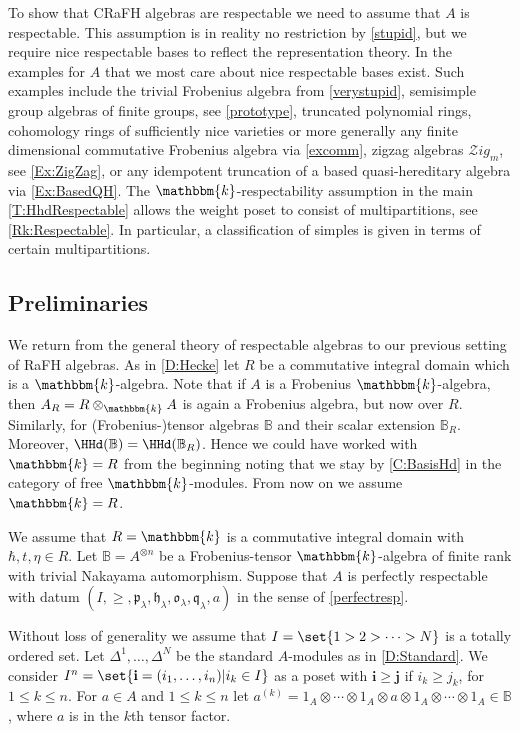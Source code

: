 \documentclass[a4paper,11pt]{amsart}
\newcommand\bi{\mathbf{i}}
\newcommand\bj{\mathbf{j}}
\numberwithin{equation}{subsection}
\theoremstyle{definition}
\theoremstyle{theorem}
\theoremstyle{remark}
\newcommand\kk{\mathbbm{k}}
\newcommand\RR{R}
\newcommand{\Bo}{\mathbb{B}}
\begin{document}
To show that CRaFH algebras are respectable we need to assume that $A$ is respectable.
This assumption is in reality no restriction by \autoref{stupid}, but we require nice respectable bases to reflect the representation theory. In the examples for $A$ that we most care about nice respectable bases exist. Such examples include  the trivial Frobenius algebra from \autoref{verystupid}, semisimple group algebras of finite
groups, see \autoref{prototype}, truncated polynomial rings, cohomology rings of
sufficiently nice varieties or more generally any finite dimensional
commutative Frobenius algebra via  \autoref{excomm},  zigzag algebras $\mathcal{Z}ig_m$, see \autoref{Ex:ZigZag}, or any idempotent truncation of a based quasi-hereditary algebra via  \autoref{Ex:BasedQH}. The $\kk$-respectability assumption in the main  \autoref{T:HhdRespectable}  allows the weight poset to consist of multipartitions, see \autoref{Rk:Respectable}. In particular,  a classification of simples is given in terms of certain multipartitions.

\subsection{Preliminaries}
We return from the general theory of respectable algebras to our previous setting of RaFH algebras. As in \autoref{D:Hecke} let $\RR$ be a commutative integral domain which is a $\kk$-algebra.  Note that if $A$ is a Frobenius $\kk$-algebra, then $A_R=R\otimes_\kk A$ is again a Frobenius algebra, but now over $R$. Similarly, for (Frobenius-)tensor algebras $\Bo$ and their scalar extension $\Bo_R$.  Moreover,  $\HHd(\Bo)=\HHd(\Bo_R)$. Hence we could have worked with $\kk=R$ from the beginning noting that we stay by \autoref{C:BasisHd} in the category of free $\kk$-modules. From now on we assume $\kk=\RR$.

\begin{Setup} \label{setups9}
We assume that $\RR=\kk$ is a commutative integral domain with $\hbar,t,\eta\in R$. Let $\Bo=A^{\otimes n}$ be a Frobenius-tensor $\kk$-algebra of finite rank with  trivial Nakayama automorphism.
  Suppose that $A$  is perfectly respectable with datum
  $(I, \ge, \mathfrak p_\lambda,\mathfrak h_\lambda,\mathfrak o_\lambda,\mathfrak q_\lambda, a)$  in the sense of \autoref{perfectresp}.

  Without loss of generality we assume that
  $I=\set{1>2>\dots>N}$ is a totally ordered set.  Let
  $\Delta^1,\dots,\Delta^N$ be the standard $A$-modules as in \autoref{D:Standard}.  We consider $I^n = \set{\bi=(i_1,\dots,i_n)|i_k\in I}$ as a poset
  with $\bi\ge\bj$ if $i_k\ge j_k$, for $1\le k\le n$.
  For $a\in A$ and $1\le k\le n$ let  $a^{(k)}=1_A\otimes\cdots\otimes 1_A\otimes  a\otimes 1_A\otimes\cdots\otimes 1_A\in\Bo$,
  where $a$ is in the $k$th tensor factor.
\end{Setup}
\end{document}
